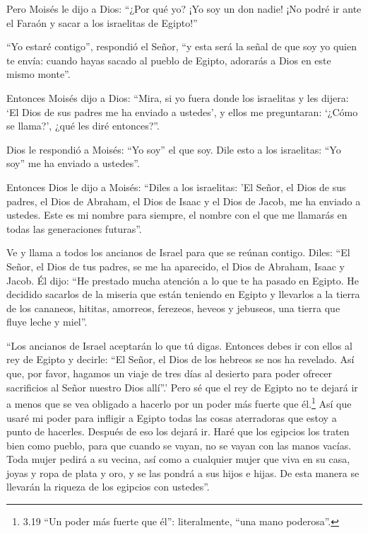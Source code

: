  Pero Moisés le dijo a Dios: ``¿Por qué yo? ¡Yo soy un don
nadie! ¡No podré ir ante el Faraón y sacar a los israelitas de Egipto!''

 ``Yo estaré contigo'', respondió el Señor, ``y esta será
la señal de que soy yo quien te envía: cuando hayas sacado al pueblo de
Egipto, adorarás a Dios en este mismo monte''.

 Entonces Moisés dijo a Dios: ``Mira, si yo fuera donde los
israelitas y les dijera: `El Dios de sus padres me ha enviado a
ustedes', y ellos me preguntaran: `¿Cómo se llama?', ¿qué les diré
entonces?''.

 Dios le respondió a Moisés: ``Yo soy'' el que soy. Dile
esto a los israelitas: ``Yo soy'' me ha enviado a ustedes''.

 Entonces Dios le dijo a Moisés: ``Diles a los israelitas:
'El Señor, el Dios de sus padres, el Dios de Abraham, el Dios de Isaac y
el Dios de Jacob, me ha enviado a ustedes. Este es mi nombre para
siempre, el nombre con el que me llamarás en todas las generaciones
futuras''.

 Ve y llama a todos los ancianos de Israel para que se
reúnan contigo. Diles: ``El Señor, el Dios de tus padres, se me ha
aparecido, el Dios de Abraham, Isaac y Jacob. Él dijo: ``He prestado
mucha atención a lo que te ha pasado en Egipto.  He
decidido sacarlos de la miseria que están teniendo en Egipto y llevarlos
a la tierra de los cananeos, hititas, amorreos, ferezeos, heveos y
jebuseos, una tierra que fluye leche y miel''.

 ``Los ancianos de Israel aceptarán lo que tú digas.
Entonces debes ir con ellos al rey de Egipto y decirle: ``El Señor, el
Dios de los hebreos se nos ha revelado. Así que, por favor, hagamos un
viaje de tres días al desierto para poder ofrecer sacrificios al Señor
nuestro Dios allí''.'  Pero sé que el rey de Egipto no te
dejará ir a menos que se vea obligado a hacerlo por un poder más fuerte
que él.\footnote{3.19 ``Un poder más fuerte que él'': literalmente,
  ``una mano poderosa''.}  Así que usaré mi poder para
infligir a Egipto todas las cosas aterradoras que estoy a punto de
hacerles. Después de eso los dejará ir.  Haré que los
egipcios los traten bien como pueblo, para que cuando se vayan, no se
vayan con las manos vacías.  Toda mujer pedirá a su vecina,
así como a cualquier mujer que viva en su casa, joyas y ropa de plata y
oro, y se las pondrá a sus hijos e hijas. De esta manera se llevarán la
riqueza de los egipcios con ustedes''.

